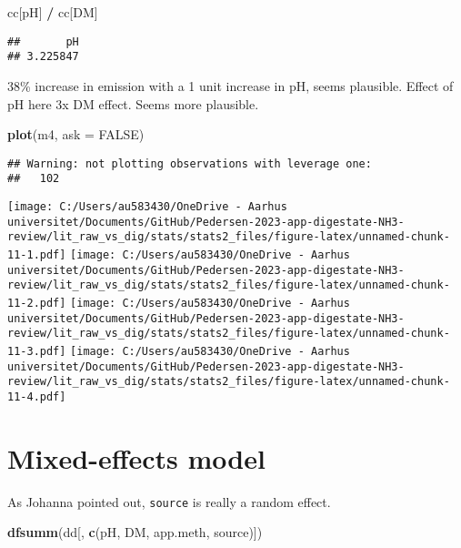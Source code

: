 \documentclass[
]{article}
\newenvironment{Shaded}{\begin{snugshade}}{\end{snugshade}}
\newcommand{\AttributeTok}[1]{\textcolor[rgb]{0.13,0.29,0.53}{#1}}
\newcommand{\ConstantTok}[1]{\textcolor[rgb]{0.56,0.35,0.01}{#1}}
\newcommand{\FunctionTok}[1]{\textcolor[rgb]{0.13,0.29,0.53}{\textbf{#1}}}
\newcommand{\NormalTok}[1]{#1}
\newcommand{\SpecialCharTok}[1]{\textcolor[rgb]{0.81,0.36,0.00}{\textbf{#1}}}
\newcommand{\StringTok}[1]{\textcolor[rgb]{0.31,0.60,0.02}{#1}}
\begin{document}
\begin{Shaded}
\begin{Highlighting}[]
\NormalTok{cc[}\StringTok{\textquotesingle{}pH\textquotesingle{}}\NormalTok{] }\SpecialCharTok{/}\NormalTok{ cc[}\StringTok{\textquotesingle{}DM\textquotesingle{}}\NormalTok{]}
\end{Highlighting}
\end{Shaded}

\begin{verbatim}
##       pH 
## 3.225847
\end{verbatim}

38\% increase in emission with a 1 unit increase in pH, seems plausible.
Effect of pH here 3x DM effect. Seems more plausible.

\begin{Shaded}
\begin{Highlighting}[]
\FunctionTok{plot}\NormalTok{(m4, }\AttributeTok{ask =} \ConstantTok{FALSE}\NormalTok{)}
\end{Highlighting}
\end{Shaded}

\begin{verbatim}
## Warning: not plotting observations with leverage one:
##   102
\end{verbatim}

\texttt{[image: C:/Users/au583430/OneDrive - Aarhus universitet/Documents/GitHub/Pedersen-2023-app-digestate-NH3-review/lit\_raw\_vs\_dig/stats/stats2\_files/figure-latex/unnamed-chunk-11-1.pdf]}
\texttt{[image: C:/Users/au583430/OneDrive - Aarhus universitet/Documents/GitHub/Pedersen-2023-app-digestate-NH3-review/lit\_raw\_vs\_dig/stats/stats2\_files/figure-latex/unnamed-chunk-11-2.pdf]}
\texttt{[image: C:/Users/au583430/OneDrive - Aarhus universitet/Documents/GitHub/Pedersen-2023-app-digestate-NH3-review/lit\_raw\_vs\_dig/stats/stats2\_files/figure-latex/unnamed-chunk-11-3.pdf]}
\texttt{[image: C:/Users/au583430/OneDrive - Aarhus universitet/Documents/GitHub/Pedersen-2023-app-digestate-NH3-review/lit\_raw\_vs\_dig/stats/stats2\_files/figure-latex/unnamed-chunk-11-4.pdf]}

\hypertarget{mixed-effects-model}{%
\section{Mixed-effects model}\label{mixed-effects-model}}

As Johanna pointed out, \texttt{source} is really a random effect.

\begin{Shaded}
\begin{Highlighting}[]
\FunctionTok{dfsumm}\NormalTok{(dd[, }\FunctionTok{c}\NormalTok{(}\StringTok{\textquotesingle{}pH\textquotesingle{}}\NormalTok{, }\StringTok{\textquotesingle{}DM\textquotesingle{}}\NormalTok{, }\StringTok{\textquotesingle{}app.meth\textquotesingle{}}\NormalTok{, }\StringTok{\textquotesingle{}source\textquotesingle{}}\NormalTok{)])}
\end{Highlighting}
\end{Shaded}
\end{document}
